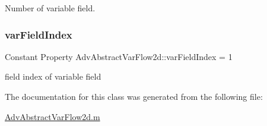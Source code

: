 Number of variable field. 

\mbox{\label{class_adv_abstract_var_flow2d_ae97bb6910e3dbc7e7f9d77091b8fb50c}} 
\subsubsection{\texorpdfstring{var\+Field\+Index}{varFieldIndex}}
{\footnotesize\ttfamily Constant Property Adv\+Abstract\+Var\+Flow2d\+::var\+Field\+Index = 1}



field index of variable field 



The documentation for this class was generated from the following file\+:\begin{DoxyCompactItemize}
\item 
\hyperlink{_adv_abstract_var_flow2d_8m}{Adv\+Abstract\+Var\+Flow2d.\+m}\end{DoxyCompactItemize}
